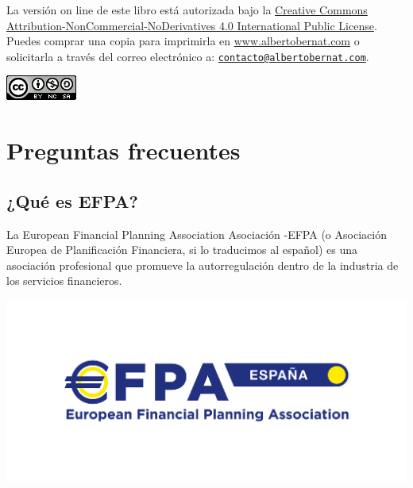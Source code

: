 \documentclass[
  letterpaper,
  DIV=11,
  numbers=noendperiod]{scrreprt}
\begin{document}
\begin{tcolorbox}[enhanced jigsaw, left=2mm, opacityback=0, colback=white, breakable, arc=.35mm, bottomrule=.15mm, rightrule=.15mm, toprule=.15mm, leftrule=.75mm, colframe=quarto-callout-warning-color-frame]

La versión on line de este libro está autorizada bajo la
\href{https://creativecommons.org/licenses/by-nc-nd/4.0/legalcode}{Creative
Commons Attribution-NonCommercial-NoDerivatives 4.0 International Public
License}. Puedes comprar una copia para imprimirla en
\href{https://sowl.co/yUAeV}{www.albertobernat.com} o solicitarla a
través del correo electrónico a:
\href{mailto:contacto@albertobernat.com}{\nolinkurl{contacto@albertobernat.com}}.

\includegraphics{./images/by-nc-sa.png}

\end{tcolorbox}


\hypertarget{preguntas-frecuentes}{%
\chapter*{Preguntas frecuentes}\label{preguntas-frecuentes}}


\hypertarget{quuxe9-es-efpa}{%
\section*{\texorpdfstring{\textbf{¿Qué es
EFPA?}}{¿Qué es EFPA?}}\label{quuxe9-es-efpa}}


La European Financial Planning Association Asociación -EFPA (o
Asociación Europea de Planificación Financiera, si lo traducimos al
español) es una asociación profesional que promueve la autorregulación
dentro de la industria de los servicios financieros.

\includegraphics{./images/EFPA_logo-01.jpg}
\end{document}
